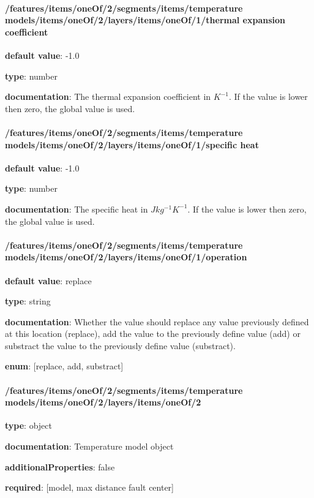 \begin{itemized}
\end{itemized}\paragraph{/features/items/oneOf/2/segments/items/temperature models/items/oneOf/2/layers/items/oneOf/1/thermal expansion coefficient} \begin{itemized}
\item {\bf default value}: -1.0
\item {\bf type}: number
\item {\bf documentation}: The thermal expansion coefficient in $K^{-1}$. If the value is lower then zero, the global value is used.
\end{itemized}\paragraph{/features/items/oneOf/2/segments/items/temperature models/items/oneOf/2/layers/items/oneOf/1/specific heat} \begin{itemized}
\item {\bf default value}: -1.0
\item {\bf type}: number
\item {\bf documentation}: The specific heat in $J kg^{-1} K^{-1}$. If the value is lower then zero, the global value is used.
\end{itemized}\paragraph{/features/items/oneOf/2/segments/items/temperature models/items/oneOf/2/layers/items/oneOf/1/operation} \begin{itemized}
\item {\bf default value}: replace
\item {\bf type}: string
\item {\bf documentation}: Whether the value should replace any value previously defined at this location (replace), add the value to the previously define value (add) or substract the value to the previously define value (substract).
\item {\bf enum}: [replace, add, substract]\end{itemized}\paragraph{/features/items/oneOf/2/segments/items/temperature models/items/oneOf/2/layers/items/oneOf/2} \begin{itemized}
\item {\bf type}: object
\item {\bf documentation}: Temperature model object
\item {\bf additionalProperties}: false
\item {\bf required}: [model, max distance fault center]\end{itemized}

